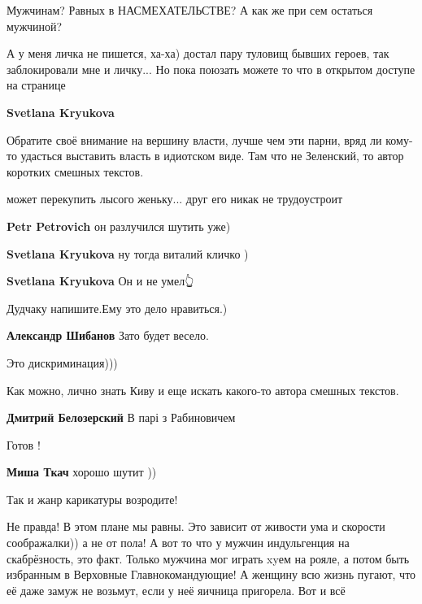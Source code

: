 \begin{itemize}
Мужчинам? Равных в НАСМЕХАТЕЛЬСТВЕ? А как же при сем остаться мужчиной?



А у меня личка не пишется, ха-ха) достал пару туловищ бывших героев, так
заблокировали мне и личку... Но пока поюзать можете то что в открытом доступе
на странице


\textbf{Svetlana Kryukova} 

Обратите своё внимание на вершину власти, лучше чем эти парни, вряд ли кому-то
удасться выставить власть в идиотском виде. Там что не Зеленский, то автор
коротких смешных текстов.

может перекупить лысого женьку... друг его никак не трудоустроит

\begin{itemize} %
\textbf{Petr Petrovich} он разлучился шутить уже)

\textbf{Svetlana Kryukova} ну тогда виталий кличко )

\textbf{Svetlana Kryukova} Он и не умел👆

Дудчаку напишите.Ему это дело нравиться.)

\textbf{Александр Шибанов} Зато будет весело.
\end{itemize} %

Это дискриминация)))


Как можно, лично знать Киву и еще искать какого-то автора смешных текстов.

\textbf{Дмитрий Белозерский} В парі з Рабиновичем

Готов !

\textbf{Миша Ткач} хорошо шутит ))


Так и жанр карикатуры возродите!


Не правда! В этом плане мы равны. Это зависит от живости ума и скорости
соображалки)) а не от пола! А вот то что у мужчин индульгенция на скабрёзность,
это факт. Только мужчина мог играть xyем на рояле, а потом быть избранным в
Верховные Главнокомандующие! А женщину всю жизнь пугают, что её даже замуж не
возьмут, если у неё яичница пригорела. Вот и всё


\end{itemize}

